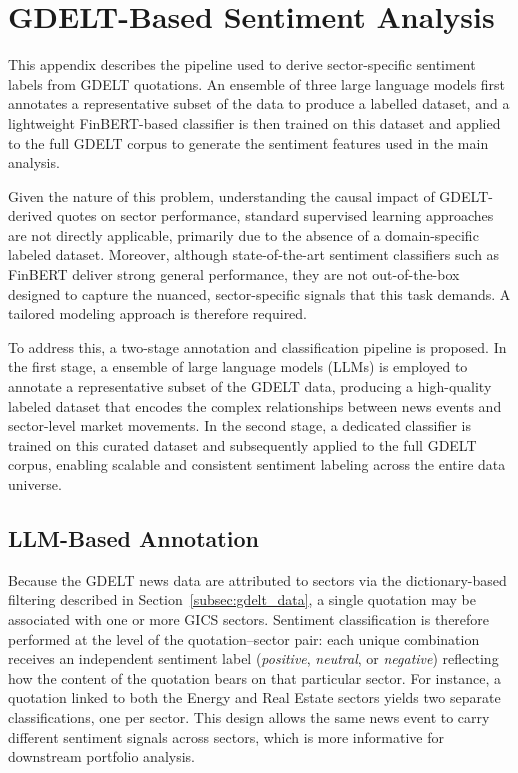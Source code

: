 \chapter{GDELT-Based Sentiment Analysis}
\label{chap:sentiment_news}

\begin{introduction}
This appendix describes the pipeline used to derive sector-specific sentiment labels from GDELT quotations. An ensemble of three large language models first annotates a representative subset of the data to produce a labelled dataset, and a lightweight FinBERT-based classifier is then trained on this dataset and applied to the full GDELT corpus to generate the sentiment features used in the main analysis.
\end{introduction}

Given the nature of this problem, understanding the causal impact of GDELT-derived quotes on sector performance, standard supervised learning approaches are not directly applicable, primarily due to the absence of a domain-specific labeled dataset. Moreover, although state-of-the-art sentiment classifiers such as FinBERT deliver strong general performance, they are not out-of-the-box designed to capture the nuanced, sector-specific signals that this task demands. A tailored modeling approach is therefore required.

To address this, a two-stage annotation and classification pipeline is proposed. In the first stage, a ensemble of large language models (LLMs) is employed to annotate a representative subset of the GDELT data, producing a high-quality labeled dataset that encodes the complex relationships between news events and sector-level market movements. In the second stage, a dedicated classifier is trained on this curated dataset and subsequently applied to the full GDELT corpus, enabling scalable and consistent sentiment labeling across the entire data universe.

\section{LLM-Based Annotation}
\label{sec:llm_annotation}

Because the GDELT news data are attributed to sectors via the dictionary-based filtering described in Section~\ref{subsec:gdelt_data}, a single quotation may be associated with one or more GICS sectors. Sentiment classification is therefore performed at the level of the quotation--sector pair: each unique combination receives an independent sentiment label (\textit{positive}, \textit{neutral}, or \textit{negative}) reflecting how the content of the quotation bears on that particular sector. For instance, a quotation linked to both the Energy and Real Estate sectors yields two separate classifications, one per sector. This design allows the same news event to carry different sentiment signals across sectors, which is more informative for downstream portfolio analysis.

